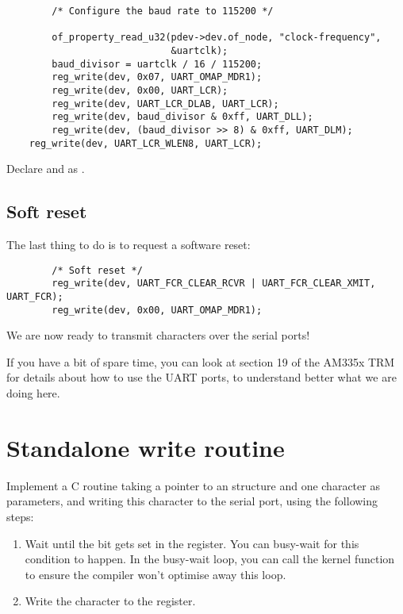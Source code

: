 \begin{verbatim}
        /* Configure the baud rate to 115200 */

        of_property_read_u32(pdev->dev.of_node, "clock-frequency",
                             &uartclk);
        baud_divisor = uartclk / 16 / 115200;
        reg_write(dev, 0x07, UART_OMAP_MDR1);
        reg_write(dev, 0x00, UART_LCR);
        reg_write(dev, UART_LCR_DLAB, UART_LCR);
        reg_write(dev, baud_divisor & 0xff, UART_DLL);
        reg_write(dev, (baud_divisor >> 8) & 0xff, UART_DLM);
	reg_write(dev, UART_LCR_WLEN8, UART_LCR);
\end{verbatim}

Declare  and  as .

\subsection{Soft reset}

The last thing to do is to request a software reset:

\begin{verbatim}
        /* Soft reset */
        reg_write(dev, UART_FCR_CLEAR_RCVR | UART_FCR_CLEAR_XMIT, UART_FCR);
        reg_write(dev, 0x00, UART_OMAP_MDR1);
\end{verbatim}

We are now ready to transmit characters over the serial ports!

If you have a bit of spare time, you can look at section 19 of the
AM335x TRM for details about how to use the UART ports, to understand
better what we are doing here.
 
\section{Standalone write routine}

Implement a C routine taking a pointer to an 
structure and one character as parameters, and writing
this character to the serial port, using the following steps:

\begin{enumerate}
\item Wait until the  bit gets set in the
   register.  You can busy-wait for this condition to happen.
  In the busy-wait loop, you can call the  kernel function
  to ensure the compiler won't optimise away this loop.
\item Write the character to the  register.
\end{enumerate}

